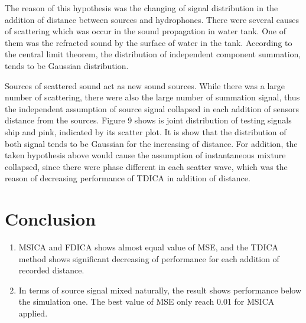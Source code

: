\documentclass[a4paper]{jpconf}
\begin{document}
The reason of this hypothesis was the changing of signal distribution in the addition of distance between sources and hydrophones.  There were several causes of scattering which was occur in the sound propagation in water tank. One of them was the refracted sound by the surface of water in the tank. According to the central limit theorem, the distribution of independent component summation, tends to be Gaussian distribution.

Sources of scattered sound act as new sound sources. While there was a large number of scattering, there were also the large number of summation signal, thus the independent assumption of source signal collapsed in each addition of sensors distance from the sources. Figure 9 shows is joint distribution of testing signals ship and pink, indicated by its scatter plot. It is show that the distribution of both signal tends to be Gaussian for the increasing of distance. For addition, the taken hypothesis above would cause the assumption of instantaneous mixture collapsed, since there were phase different in each scatter wave, which was the reason of decreasing performance of TDICA in addition of distance.

\section{Conclusion}
\renewcommand{\theenumi}{\arabic{enumi}}
\begin{enumerate}
	\item MSICA and FDICA shows almost equal value of MSE, and the TDICA method shows significant decreasing of performance for each addition of recorded distance.
	\item In terms of source signal mixed naturally, the result shows performance below the simulation one. The best value of MSE only reach 0.01 for MSICA applied.
\end{enumerate}
\end{document}

